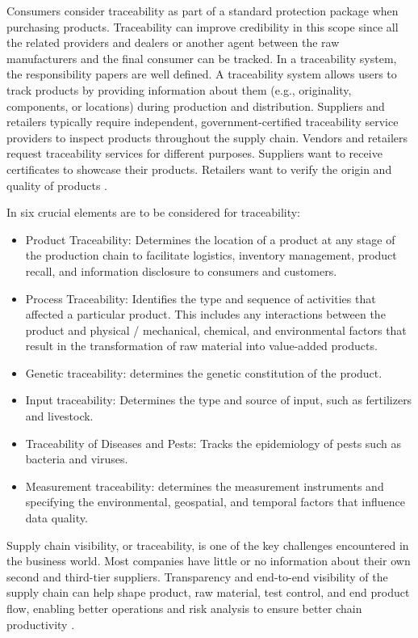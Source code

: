 Consumers consider traceability as part of a standard protection package when purchasing products. Traceability can improve credibility in this scope since all the related providers and dealers or another agent between the raw manufacturers and the final consumer can be tracked. In a traceability system, the responsibility papers are well defined. A traceability system allows users to track products by providing information about them (e.g., originality, components, or locations) during production and distribution. Suppliers and retailers typically require independent, government-certified traceability service providers to inspect products throughout the supply chain. Vendors and retailers request traceability services for different purposes. Suppliers want to receive certificates to showcase their products. Retailers want to verify the origin and quality of products \cite{lu2017adaptable}.


In \cite{opara2003traceability} six crucial elements are to be considered for traceability:

\begin{itemize}
\item Product Traceability: Determines the location of a product at any stage of the production chain to facilitate logistics, inventory management, product recall, and information disclosure to consumers and customers.
\item Process Traceability: Identifies the type and sequence of activities that affected a particular product. This includes any interactions between the product and physical / mechanical, chemical, and environmental factors that result in the transformation of raw material into value-added products.
\item Genetic traceability: determines the genetic constitution of the product.
\item Input traceability: Determines the type and source of input, such as fertilizers and livestock.
\item Traceability of Diseases and Pests: Tracks the epidemiology of pests such as bacteria and viruses.
\item Measurement traceability: determines the measurement instruments and specifying the environmental, geospatial, and temporal factors that influence data quality.
\end{itemize}

Supply chain visibility, or traceability,  is one of the key challenges encountered in the business world. Most companies have little or no information about their own second and third-tier suppliers. Transparency and end-to-end visibility of the supply chain can help shape product, raw material, test control, and end product flow, enabling better operations and risk analysis to ensure better chain productivity \cite{abeyratne2016blockchain}.

